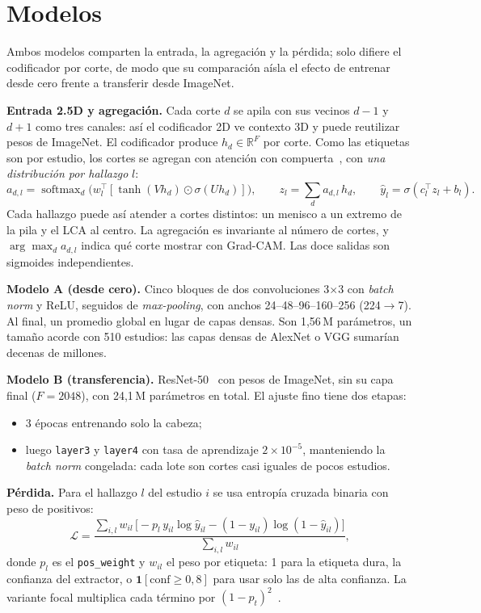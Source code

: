 \section{Modelos}
\label{sec:modelos}

Ambos modelos comparten la entrada, la agregación y la pérdida; solo difiere el codificador
por corte, de modo que su comparación aísla el efecto de entrenar desde cero frente a
transferir desde ImageNet.

\textbf{Entrada 2.5D y agregación.} Cada corte $d$ se apila con sus vecinos $d-1$ y $d+1$
como tres canales: así el codificador 2D ve contexto 3D y puede reutilizar pesos de ImageNet.
El codificador produce $h_d \in \mathbb{R}^F$ por corte. Como las etiquetas son por estudio,
los cortes se agregan con atención con compuerta~\citep{ilse2018attention}, con \emph{una
distribución por hallazgo} $l$:
\begin{equation}
  a_{d,l} = \operatorname{softmax}_d\!\big(w_l^\top[\tanh(Vh_d)\odot\sigma(Uh_d)]\big),\qquad
  z_l = \textstyle\sum_d a_{d,l}\,h_d,\qquad
  \hat y_l = \sigma(c_l^\top z_l + b_l).
\end{equation}
Cada hallazgo puede así atender a cortes distintos: un menisco a un extremo de la pila y el
LCA al centro. La agregación es invariante al número de cortes, y $\arg\max_d a_{d,l}$
indica qué corte mostrar con Grad-CAM. Las doce salidas son sigmoides independientes.

\textbf{Modelo A (desde cero).} Cinco bloques de dos convoluciones 3$\times$3 con
\emph{batch norm} y ReLU, seguidos de \emph{max-pooling}, con anchos 24--48--96--160--256
(224$\to$7). Al final, un promedio global en lugar de capas densas. Son 1,56\,M parámetros,
un tamaño acorde con 510 estudios: las capas densas de AlexNet o VGG sumarían decenas de
millones.

\textbf{Modelo B (transferencia).} ResNet-50~\citep{he2016resnet} con pesos de ImageNet, sin
su capa final ($F=2048$), con 24,1\,M parámetros en total. El ajuste fino tiene dos etapas:
\begin{itemize}
  \item 3 épocas entrenando solo la cabeza;
  \item luego \texttt{layer3} y \texttt{layer4} con tasa de aprendizaje $2\times10^{-5}$,
        manteniendo la \emph{batch norm} congelada: cada lote son cortes casi iguales de pocos
        estudios.
\end{itemize}

\textbf{Pérdida.} Para el hallazgo $l$ del estudio $i$ se usa entropía cruzada binaria con
peso de positivos:
\begin{equation}
  \mathcal L = \frac{\sum_{i,l} w_{il}\,\big[-p_l\,y_{il}\log\hat y_{il}
     - (1-y_{il})\log(1-\hat y_{il})\big]}{\sum_{i,l} w_{il}},
\end{equation}
donde $p_l$ es el \texttt{pos\_weight} y $w_{il}$ el peso por etiqueta: 1 para la etiqueta
dura, la confianza del extractor, o $\mathbf 1[\text{conf}\ge0{,}8]$ para usar solo las de
alta confianza. La variante focal multiplica cada término por $(1-p_t)^{2}$~\citep{lin2017focal}.

